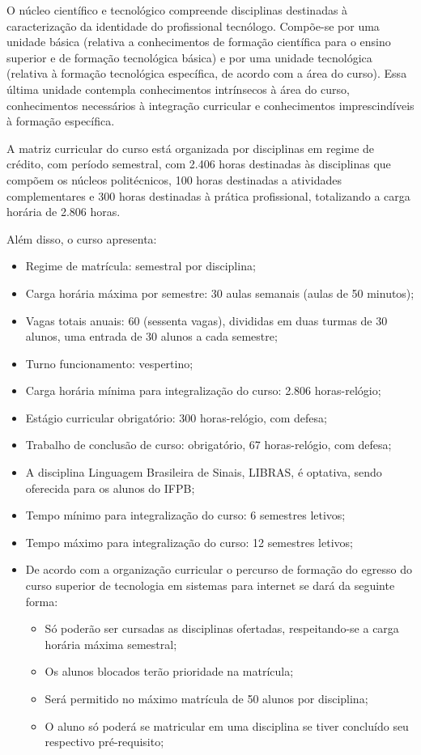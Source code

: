 	O núcleo científico e tecnológico compreende disciplinas destinadas à caracterização da identidade do profissional tecnólogo. Compõe-se por uma unidade básica (relativa a conhecimentos de formação científica para o ensino superior e de formação tecnológica básica) e por uma unidade tecnológica (relativa à formação tecnológica específica, de acordo com a área do curso). Essa última unidade contempla conhecimentos intrínsecos à área do curso, conhecimentos necessários à integração curricular e conhecimentos imprescindíveis à formação específica.

	A matriz curricular do curso está organizada por disciplinas em regime de crédito, com período semestral, com 2.406 horas destinadas às disciplinas que compõem os núcleos politécnicos, 100 horas destinadas a atividades complementares e 300 horas destinadas à prática profissional, totalizando a carga horária de 2.806 horas.
	
	Além disso, o curso apresenta:

	\begin{itemize}
		\item Regime de matrícula: semestral por disciplina; 
		\item Carga horária máxima por semestre: 30 aulas semanais (aulas de 50 minutos);
		\item Vagas totais anuais: 60 (sessenta vagas), divididas em duas turmas de 30 alunos, uma entrada de 30 alunos a cada semestre; 
		\item Turno funcionamento: vespertino;
		\item Carga horária mínima para integralização do curso: 2.806 horas-relógio;
		\item Estágio curricular obrigatório: 300 horas-relógio, com defesa; 
		\item Trabalho de conclusão de curso: obrigatório, 67 horas-relógio, com defesa; 
		\item A disciplina Linguagem Brasileira de Sinais, LIBRAS, é optativa, sendo oferecida para os alunos do IFPB;
		\item Tempo mínimo para integralização do curso: 6 semestres letivos;
		\item Tempo máximo para integralização do curso: 12 semestres letivos;
		\item De acordo com a organização curricular o percurso de formação do egresso do curso superior de tecnologia em sistemas para internet se dará da seguinte forma:
		\begin{itemize}
			\item Só poderão ser cursadas as disciplinas ofertadas, respeitando-se a carga horária máxima semestral;
			\item Os alunos blocados terão prioridade na matrícula;
			\item Será permitido no máximo matrícula de 50 alunos por disciplina;
			\item O aluno só poderá se matricular em uma disciplina se tiver concluído seu respectivo pré-requisito;
		\end{itemize}
	\end{itemize}

